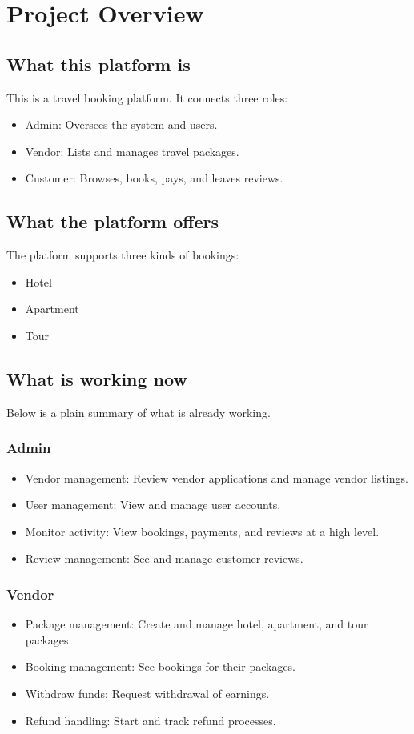 \chapter{Project Overview}

\section{What this platform is}
This is a travel booking platform. It connects three roles:
\begin{itemize}
  \item Admin: Oversees the system and users.
  \item Vendor: Lists and manages travel packages.
  \item Customer: Browses, books, pays, and leaves reviews.
\end{itemize}

\section{What the platform offers}
The platform supports three kinds of bookings:
\begin{itemize}
  \item Hotel
  \item Apartment
  \item Tour
\end{itemize}

\section{What is working now}
Below is a plain summary of what is already working.

\subsection*{Admin}
\begin{itemize}
  \item Vendor management: Review vendor applications and manage vendor listings.
  \item User management: View and manage user accounts.
  \item Monitor activity: View bookings, payments, and reviews at a high level.
  \item Review management: See and manage customer reviews.
\end{itemize}

\subsection*{Vendor}
\begin{itemize}
  \item Package management: Create and manage hotel, apartment, and tour packages.
  \item Booking management: See bookings for their packages.
  \item Withdraw funds: Request withdrawal of earnings.
  \item Refund handling: Start and track refund processes.
\end{itemize}

